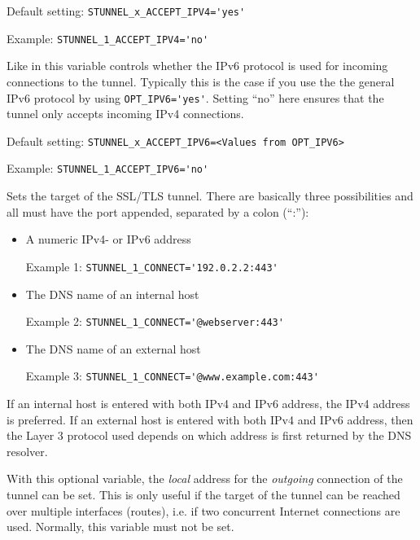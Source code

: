 \begin{description}
Default setting: \verb+STUNNEL_x_ACCEPT_IPV4='yes'+

Example: \verb+STUNNEL_1_ACCEPT_IPV4='no'+


Like in  this variable controls whether the IPv6
protocol is used for incoming connections to the tunnel. Typically this is the case
if you use the the general IPv6 protocol by using \verb+OPT_IPV6='yes'+. Setting
``no'' here ensures that the tunnel only accepts incoming IPv4 connections.

Default setting: \verb+STUNNEL_x_ACCEPT_IPV6=<Values from OPT_IPV6>+

Example: \verb+STUNNEL_1_ACCEPT_IPV6='no'+


Sets the target of the SSL/TLS tunnel. There are basically three possibilities and all
must have the port  appended, separated by a colon (``:''):

\begin{itemize}
\item A numeric IPv4- or IPv6 address

Example 1: \verb+STUNNEL_1_CONNECT='192.0.2.2:443'+

\item The DNS name of an internal host

Example 2: \verb+STUNNEL_1_CONNECT='@webserver:443'+

\item The DNS name of an external host

Example 3: \verb+STUNNEL_1_CONNECT='@www.example.com:443'+
\end{itemize}

If an internal host is entered with both IPv4 and IPv6 address,
the IPv4 address is preferred. If an external host is entered with both
IPv4 and IPv6 address, then the Layer 3 protocol used depends on
which address is first returned by the DNS resolver.


With this optional variable, the \emph{local} address for the
\emph{outgoing} connection of the tunnel can be set. This is only
useful if the target of the tunnel can be reached over multiple interfaces
(routes), i.e. if two concurrent Internet connections are used.
Normally, this variable must not be set.


\end{description}
